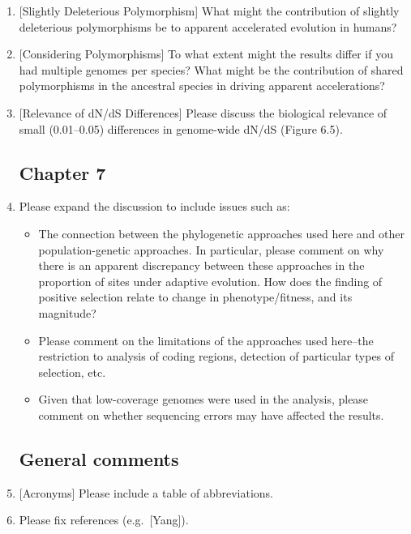 \begin{enumerate}
\item{[Slightly Deleterious Polymorphism] What might the contribution of slightly deleterious polymorphisms be
to apparent accelerated evolution in humans?}

\item{[Considering Polymorphisms] To what extent might the results differ if you had multiple genomes
per species? What might be the contribution of shared polymorphisms in
the ancestral species in driving apparent accelerations?}

\item{[Relevance of dN/dS Differences] Please discuss the biological relevance of small (0.01--0.05)
differences in genome-wide dN/dS (Figure 6.5).}

\subsection{Chapter 7}

\item{Please expand the discussion to include issues such as:
  \begin{itemize}
  \item{The connection between the phylogenetic approaches used here
    and other population-genetic approaches. In particular, please
    comment on why there is an apparent discrepancy between these
    approaches in the proportion of sites under adaptive
    evolution. How does the finding of positive selection relate to
    change in phenotype/fitness, and its magnitude?}
  \item{Please comment on the limitations of the approaches used
    here--the restriction to analysis of coding regions, detection of
    particular types of selection, etc.}
  \item{Given that low-coverage genomes were used in the analysis,
    please comment on whether sequencing errors may have affected the
    results.}
  \end{itemize}
}

\subsection{General comments}

\item{[Acronyms] Please include a table of abbreviations.

}

\item{Please fix references (e.g.\ [Yang]).}


\end{enumerate}
